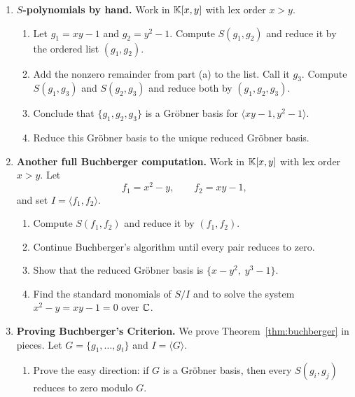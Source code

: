 \documentclass[12pt,reqno]{amsart}
\begin{document}
\hrulefill

\begin{enumerate}[leftmargin=*, resume=problems]

\item \textbf{$S$-polynomials by hand.} Work in $\mathbb{K}[x,y]$ with lex order $x>y$.
\begin{enumerate}[label=(\alph*),ref=\theenumi\alph*]
    \item Let $g_1=xy-1$ and $g_2=y^2-1$. Compute $S(g_1,g_2)$ and reduce it by the ordered list $(g_1,g_2)$.
    
    \item Add the nonzero remainder from part (a) to the list. Call it $g_3$. Compute $S(g_1,g_3)$ and $S(g_2,g_3)$ and reduce both by $(g_1,g_2,g_3)$.
    
    \item Conclude that $\{g_1,g_2,g_3\}$ is a Gr\"obner basis for $\langle xy-1,y^2-1\rangle$.
    
    \item Reduce this Gr\"obner basis to the unique reduced Gr\"obner basis.
\end{enumerate}

\item \textbf{Another full Buchberger computation.} Work in $\mathbb{K}[x,y]$ with lex order $x>y$. Let
\[
    f_1=x^2-y,\qquad f_2=xy-1,
\]
and set $I=\langle f_1,f_2\rangle$.
\begin{enumerate}[label=(\alph*),ref=\theenumi\alph*]
    \item Compute $S(f_1,f_2)$ and reduce it by $(f_1,f_2)$.
    
    \item Continue Buchberger's algorithm until every pair reduces to zero.
    
    \item Show that the reduced Gr\"obner basis is $ \{x-y^2,\; y^3-1\}$.

    \item Find the standard monomials of $S/I$ and to solve the system $x^2-y=xy-1=0$ over $\mathbb{C}$.
\end{enumerate}

\item \textbf{Proving Buchberger's Criterion.} We prove Theorem~\ref{thm:buchberger} in pieces. Let $G=\{g_1,\ldots,g_t\}$ and $I=\langle G\rangle$.
\begin{enumerate}[label=(\alph*),ref=\theenumi\alph*]
    \item Prove the easy direction: if $G$ is a Gr\"obner basis, then every $S(g_i,g_j)$ reduces to zero modulo $G$.
    

\end{enumerate}
\end{enumerate}
\end{document}
